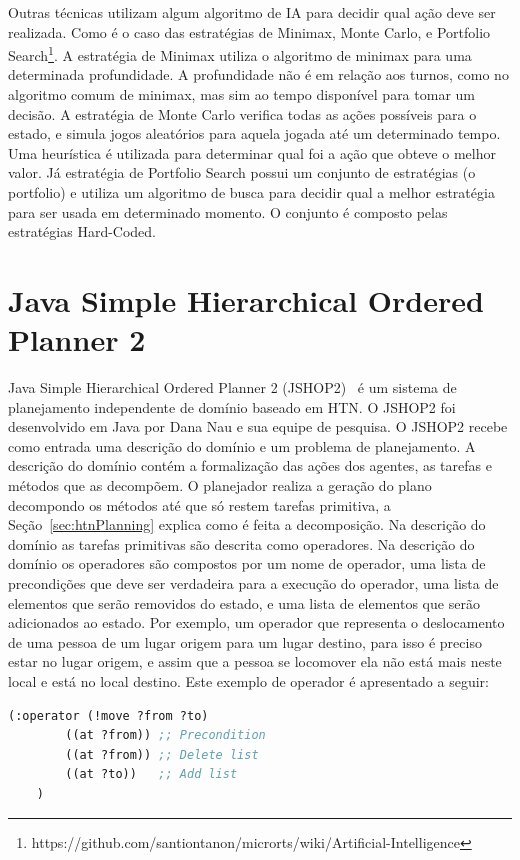 Outras técnicas utilizam algum algoritmo de IA para decidir qual ação deve ser realizada.
Como é o caso das estratégias de Minimax\cite{ontanon2012minimax}, Monte Carlo, e Portfolio Search\footnote{https://github.com/santiontanon/microrts/wiki/Artificial-Intelligence}.
A estratégia de Minimax utiliza o algoritmo de minimax para uma determinada profundidade. A profundidade não é em relação aos turnos, como no algoritmo comum de minimax, mas sim ao tempo disponível para tomar um decisão.
A estratégia de Monte Carlo verifica todas as ações possíveis para o estado, e simula jogos aleatórios para aquela jogada até um determinado tempo. Uma heurística é utilizada para determinar qual foi a ação que obteve o melhor valor.
Já estratégia de Portfolio Search possui um conjunto de estratégias (o portfolio) e utiliza um algoritmo de busca para decidir qual a melhor estratégia para ser usada em determinado momento. 
O conjunto é composto pelas estratégias Hard-Coded.

\section{Java Simple Hierarchical Ordered Planner 2}\label{sec:jshop}
		
Java Simple Hierarchical Ordered Planner 2 (JSHOP2)~\cite{nauJSHOP2} é um sistema de planejamento independente de domínio baseado em HTN. 
O JSHOP2 foi desenvolvido em Java por Dana Nau e sua equipe de pesquisa.  
O JSHOP2 recebe como entrada uma descrição do domínio e um problema de planejamento.
A descrição do domínio contém a formalização das ações dos agentes, as tarefas e métodos que as decompõem.
O planejador realiza a geração do plano decompondo os métodos até que só restem tarefas primitiva, a Seção~\ref{sec:htnPlanning} explica como é feita a decomposição. 
Na descrição do domínio as tarefas primitivas são descrita como operadores. 
Na descrição do domínio os operadores são compostos por um nome de operador, uma lista de precondições que deve ser verdadeira para a execução do operador, uma lista de elementos que serão removidos do estado, e uma lista de elementos que serão adicionados ao estado. 
Por exemplo, um operador que representa o deslocamento de uma pessoa de um lugar origem para um lugar destino, para isso é preciso estar no lugar origem, e assim que a pessoa se locomover ela não está mais neste local e está no local destino. Este exemplo de operador é apresentado a seguir:

\lstset{style=codeStyle}
\begin{lstlisting}[language=lisp]
	(:operator (!move ?from ?to) 
		((at ?from)) ;; Precondition
		((at ?from)) ;; Delete list
		((at ?to))   ;; Add list
	)
\end{lstlisting}

